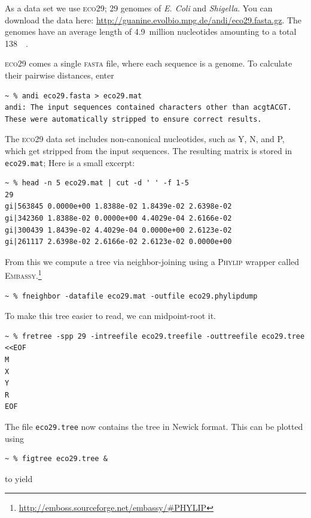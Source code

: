 \documentclass[a4paper,
  10pt,
  english,
  DIV=12,
  BCOR=8mm]{scrbook}
\newcommand{\algo}[1]{\textsc{{#1}}}
\newcommand{\word}[1]{\textsf{\small#1}}
\begin{document}
As a data set we use \algo{eco29}; 29 genomes of \textit{E. Coli} and \textit{Shigella}. You can download the data here: {\small{\url{http://guanine.evolbio.mpg.de/andi/eco29.fasta.gz}}}. The genomes have an average length of 4.9~million nucleotides amounting to a total \SI{138}{\mega\byte}.

\algo{eco29} comes a single \algo{fasta} file, where each sequence is a genome. To calculate their pairwise distances, enter

\begin{lstlisting}
~ % andi eco29.fasta > eco29.mat
andi: The input sequences contained characters other than acgtACGT. These were automatically stripped to ensure correct results.
\end{lstlisting}

\noindent The \algo{eco29} data set includes non-canonical nucleotides, such as \word{Y}, \word{N}, and \word{P}, which get stripped from the input sequences. The resulting matrix is stored in \lstinline$eco29.mat$; Here is a small excerpt:

\begin{lstlisting}
~ % head -n 5 eco29.mat | cut -d ' ' -f 1-5
29
gi|563845 0.0000e+00 1.8388e-02 1.8439e-02 2.6398e-02
gi|342360 1.8388e-02 0.0000e+00 4.4029e-04 2.6166e-02
gi|300439 1.8439e-02 4.4029e-04 0.0000e+00 2.6123e-02
gi|261117 2.6398e-02 2.6166e-02 2.6123e-02 0.0000e+00
\end{lstlisting}

\noindent From this we compute a tree via neighbor-joining using a \algo{Phylip} wrapper called \algo{Embassy}.\footnote{\url{http://emboss.sourceforge.net/embassy/\#PHYLIP}}

\begin{lstlisting}
~ % fneighbor -datafile eco29.mat -outfile eco29.phylipdump
\end{lstlisting}
\noindent To make this tree easier to read, we can midpoint-root it.
\begin{lstlisting}
~ % fretree -spp 29 -intreefile eco29.treefile -outtreefile eco29.tree <<EOF
M
X
Y
R
EOF
\end{lstlisting}

\noindent The file \lstinline$eco29.tree$ now contains the tree in Newick format. This can be plotted using \cite{figtree}

\begin{lstlisting}
~ % figtree eco29.tree &
\end{lstlisting}

\noindent to yield
\end{document}
